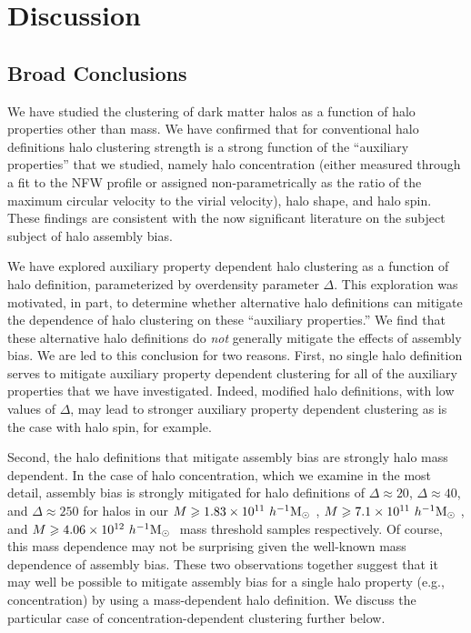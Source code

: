 \documentclass[usenatbib,fleqn]{mnras}
\begin{document}
\section{Discussion}
\label{section:discussion}

\subsection{Broad Conclusions}

We have studied the clustering of dark matter halos as a function of halo properties other than mass. We have confirmed that for conventional halo definitions halo clustering strength is a strong function of the  ``auxiliary properties'' that we studied, namely halo concentration (either measured through a fit to the NFW profile or assigned non-parametrically as the ratio of the maximum circular velocity to the virial velocity), halo shape, and halo spin. These findings are consistent with the now significant literature on the subject subject of halo assembly bias. \citep{peacock_smith00, wechsler_etal02,sheth_tormen04, gao_etal05, zentner_etal05, allgood_etal06, harker_etal06, wechsler_etal06, croton_etal07, zentner07, dalal_etal08, zentner_etal14, mao_etal15, sunayama_etal16}

We have explored auxiliary property dependent halo clustering as a function of halo definition, parameterized by overdensity parameter $\Delta$. This exploration was motivated, in part, to determine whether alternative halo definitions can mitigate the dependence of halo clustering on these ``auxiliary properties.'' We find that these alternative halo definitions do {\em not} generally mitigate the effects of assembly bias. We are led to this conclusion for two reasons. First, no single halo definition serves to mitigate auxiliary property dependent clustering for all of the auxiliary properties that we have investigated. Indeed, modified halo definitions, with low values of $\Delta$, may lead to stronger auxiliary property dependent clustering as is the case with halo spin, for example.

Second, the halo definitions that mitigate assembly bias are strongly halo mass dependent. In the case of halo concentration, which we examine in the most detail, assembly bias is strongly mitigated for halo definitions of $\Delta \approx 20$, $\Delta \approx 40$, and $\Delta \approx 250$ for halos in our $M \geqslant 1.83 \times 10^{11} \ h^{-1}\mathrm{M}_{\odot}~$, $M \geqslant 7.1 \times 10^{11} \ h^{-1}\mathrm{M}_{\odot}~$, and $M \geqslant 4.06 \times 10^{12} \ h^{-1}\mathrm{M}_{\odot}~$ mass threshold samples respectively. Of course, this mass dependence may not be surprising given the well-known mass dependence of assembly bias. These two observations together suggest that it may well be possible to mitigate assembly bias for a single halo property (e.g., concentration) by using a mass-dependent halo definition. We discuss the particular case of concentration-dependent clustering further below.
\end{document}
